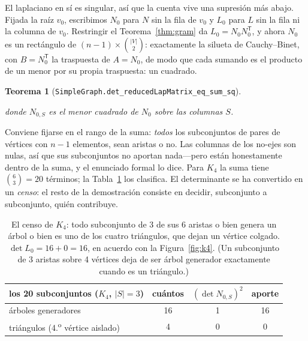 \documentclass[11pt]{article}
\newtheorem{theorem}{Teorema}
\newcommand{\lean}[1]{\texttt{#1}}
\newcommand{\keyeq}[1]{\begin{center}\keybox{$\displaystyle #1$}\end{center}}
\begin{document}
El laplaciano en s\'i es singular, as\'i que la cuenta vive una supresi\'on m\'as abajo.
Fijada la ra\'iz $v_0$, escribimos $N_0$ para $N$ sin la fila de $v_0$ y $L_0$ para $L$ sin la
fila ni la columna de $v_0$. Restringir el Teorema~\ref{thm:gram} da
$L_0=N_0N_0^{\mathsf T}$, y ahora $N_0$ es un rect\'angulo de
$(n-1)\times\binom{|V|}{2}$: exactamente la silueta de Cauchy--Binet, con
$B=N_0^{\mathsf T}$ la traspuesta de $A=N_0$, de modo que cada sumando es el producto de un
menor por su propia traspuesta: un cuadrado.

\begin{theorem}[{\lean{SimpleGraph.det\_reducedLapMatrix\_eq\_sum\_sq}}]
\label{thm:sum}
\keyeq{\det L_0\;=\;\sum_{\substack{S\subseteq\mathrm{Sym}^2V\\ |S|=n-1}}
  \bigl(\det N_{0,S}\bigr)^{2}}
donde $N_{0,S}$ es el menor cuadrado de $N_0$ sobre las columnas $S$.
\end{theorem}

Conviene fijarse en el rango de la suma: \emph{todos} los subconjuntos de pares de v\'ertices
con $n-1$ elementos, sean aristas o no. Las columnas de los no-ejes son nulas, as\'i que sus
subconjuntos no aportan nada---pero est\'an honestamente dentro de la suma, y el enunciado
formal lo dice. Para $K_4$ la suma tiene $\binom{6}{3}=20$ t\'erminos; la Tabla~\ref{tab:k4}
los clasifica. El determinante se ha convertido en un \emph{censo}: el resto de la
demostraci\'on consiste en decidir, subconjunto a subconjunto, qui\'en contribuye.

\begin{table}[h]
\centering
{}
\begin{tabular}{lccc}
\toprule
\rowcolor{ggteal!18} los 20 subconjuntos ($K_4$, $|S|=3$) & cu\'antos & $(\det N_{0,S})^2$ & aporte \\
\midrule
\'arboles generadores                      & 16 & 1 & 16 \\
tri\'angulos (4.\textsuperscript{o} v\'ertice aislado) & 4  & 0 & 0  \\
\bottomrule
\end{tabular}
\caption{El censo de $K_4$: todo subconjunto de 3 de sus 6 aristas o bien genera un \'arbol o
bien es uno de los cuatro tri\'angulos, que dejan un v\'ertice colgado. $\det L_0=16+0=16$, en
acuerdo con la Figura~\ref{fig:k4}. (Un subconjunto de 3 aristas sobre 4 v\'ertices deja de ser
\'arbol generador exactamente cuando es un tri\'angulo.)}
\label{tab:k4}
\end{table}
\end{document}
